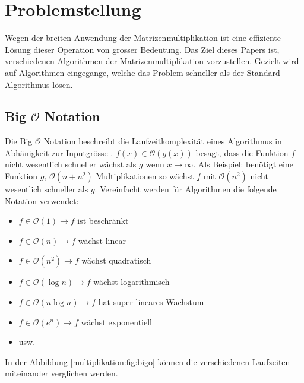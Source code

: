 %
%
%
\section{Problemstellung}
Wegen der breiten Anwendung der Matrizenmultiplikation ist eine effiziente L\"osung dieser Operation von grosser Bedeutung.
Das Ziel dieses Papers ist, verschiedenen Algorithmen der Matrizenmultiplikation vorzustellen.
Gezielt wird auf Algorithmen eingegange, welche das Problem schneller als der Standard Algorithmus l\"osen.

\subsection{Big $\mathcal{O}$ Notation}
\label{muliplikation:sec:bigo}
Die Big $\mathcal{O}$ Notation beschreibt die Laufzeitkomplexit\"at eines Algorithmus in Abhänigkeit zur Inputgrösse \cite{multiplikation:bigo}.
$f(x) \in \mathcal{O}(g(x))$ besagt, dass die Funktion $f$ nicht wesentlich schneller w\"achst als $g$ wenn $x \rightarrow \infty$.
Als Beispiel: benötigt eine Funktion $g$, $\mathcal{O}\left(n+n^2 \right)$ Multiplikationen so wächst $f$ mit $\mathcal{O}\left(n^2 \right)$ nicht wesentlich schneller als $g$.
Vereinfacht werden f\"ur Algorithmen die folgende Notation verwendet:
\begin{itemize}
	\item $f \in \mathcal{O}(1) \rightarrow f$ ist beschr\"ankt
	\item $f \in \mathcal{O}(n) \rightarrow f$ w\"achst linear
	\item $f \in \mathcal{O}\left (n^2 \right ) \rightarrow f$ w\"achst quadratisch
	\item $f \in \mathcal{O}(\log n) \rightarrow f$ w\"achst logarithmisch
	\item $f \in \mathcal{O}(n \log n) \rightarrow f$ hat super-lineares Wachstum
	\item $f \in \mathcal{O}\left (e^n \right ) \rightarrow f$ w\"achst exponentiell
	\item usw.
\end{itemize}

In der Abbildung \ref{multiplikation:fig:bigo} k\"onnen die verschiedenen Laufzeiten miteinander verglichen werden.

